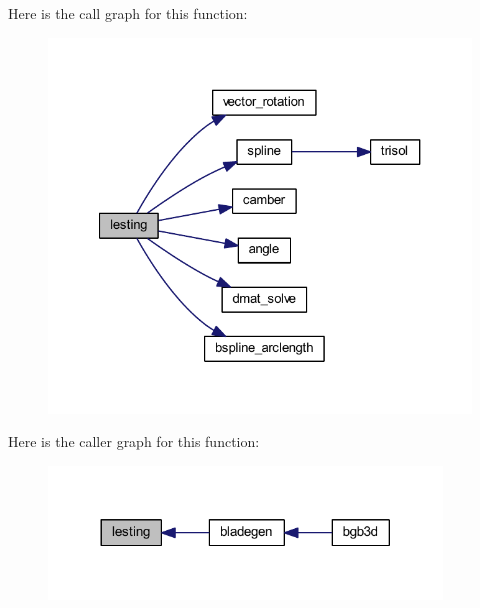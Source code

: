 Here is the call graph for this function\+:
\nopagebreak
\begin{figure}[H]
\begin{center}
\leavevmode
\includegraphics[width=327pt]{lesting_8f90_a6287cbd202ef2915df01dc492cc4384c_cgraph}
\end{center}
\end{figure}




Here is the caller graph for this function\+:
\nopagebreak
\begin{figure}[H]
\begin{center}
\leavevmode
\includegraphics[width=296pt]{lesting_8f90_a6287cbd202ef2915df01dc492cc4384c_icgraph}
\end{center}
\end{figure}


